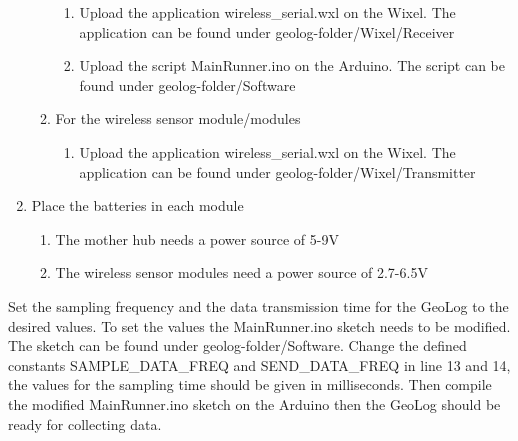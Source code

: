 \begin{enumerate}
\begin{enumerate}
\begin{enumerate}
		\item Upload the application wireless\_serial.wxl on the Wixel. The application can be found under geolog-folder/Wixel/Receiver
		\item Upload the script MainRunner.ino on the Arduino. The script can be found under geolog-folder/Software
		\end{enumerate}
	\item For the wireless sensor module/modules
		\begin{enumerate}
		\item Upload the application wireless\_serial.wxl on the Wixel. The application can be found under geolog-folder/Wixel/Transmitter
		\end{enumerate} 
	\end{enumerate}
\item Place the batteries in each module
	\begin{enumerate}
	\item The mother hub needs a power source of 5-9V
	\item The wireless sensor modules need a power source of 2.7-6.5V
	\end{enumerate}
\end{enumerate}

Set the sampling frequency and the data transmission time for the GeoLog to the desired values. To set the values the MainRunner.ino sketch needs to be modified. The sketch can be found under geolog-folder/Software. Change the defined constants SAMPLE\_DATA\_FREQ and SEND\_DATA\_FREQ in line 13 and 14, the values for the sampling time should be given in milliseconds. Then compile the modified MainRunner.ino sketch on the Arduino then the GeoLog should be ready for collecting data.\\

